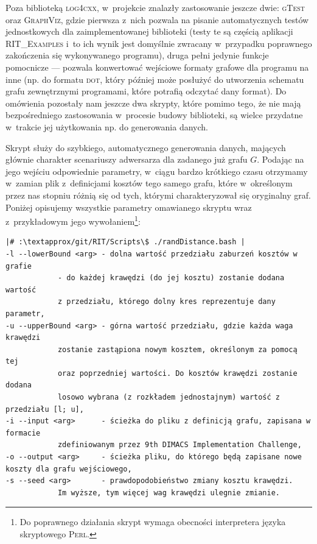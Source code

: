 Poza biblioteką \textsc{log4cxx}, w~projekcie znalazły zastosowanie jeszcze dwie: \textsc{gTest} oraz \textsc{GraphViz}, gdzie pierwsza z~nich pozwala na pisanie automatycznych testów jednostkowych dla zaimplementowanej biblioteki (testy te są częścią aplikacji \textsc{RIT\_Examples} i~to ich wynik jest domyślnie zwracany w~przypadku poprawnego zakończenia się wykonywanego programu), druga pełni jedynie funkcje pomocnicze --- pozwala konwertować wejściowe formaty grafowe dla programu na inne (np. do formatu \textsc{dot}, który później może posłużyć do utworzenia schematu grafu zewnętrznymi programami, które potrafią odczytać dany format). Do omówienia pozostały nam jeszcze dwa skrypty, które pomimo tego, że nie mają bezpośredniego zastosowania w~procesie budowy biblioteki, są wielce przydatne w~trakcie jej użytkowania np. do generowania danych.


Skrypt służy do szybkiego, automatycznego generowania danych, mających głównie charakter scenariuszy adwersarza dla zadanego już grafu $G$. Podając na jego wejściu odpowiednie parametry, w~ciągu bardzo krótkiego czasu otrzymamy w~zamian plik z~definicjami kosztów tego samego grafu, które w~określonym przez nas stopniu różnią się od tych, którymi charakteryzował się oryginalny graf. Poniżej opisujemy wszystkie parametry omawianego skryptu wraz z~przykładowym jego wywołaniem\footnote{Do poprawnego działania skrypt wymaga obecności interpretera języka skryptowego \textsc{Perl}.}:

\begin{verbatim}
|# :\textapprox/git/RIT/Scripts\$ ./randDistance.bash |
-l --lowerBound <arg> - dolna wartość przedziału zaburzeń kosztów w grafie 
			- do każdej krawędzi (do jej kosztu) zostanie dodana wartość 
			z przedziału, którego dolny kres reprezentuje dany parametr,
-u --upperBound <arg> - górna wartość przedziału, gdzie każda waga krawędzi
			zostanie zastąpiona nowym kosztem, określonym za pomocą tej 
			oraz poprzedniej wartości. Do kosztów krawędzi zostanie dodana 
			losowo wybrana (z rozkładem jednostajnym) wartość z przedziału [l; u],
-i --input <arg>      - ścieżka do pliku z definicją grafu, zapisana w formacie 
			zdefiniowanym przez 9th DIMACS Implementation Challenge,
-o --output <arg>     - ścieżka pliku, do którego będą zapisane nowe koszty dla grafu wejściowego,
-s --seed <arg>       - prawdopodobieństwo zmiany kosztu krawędzi. 
			Im wyższe, tym więcej wag krawędzi ulegnie zmianie.
\end{verbatim}

